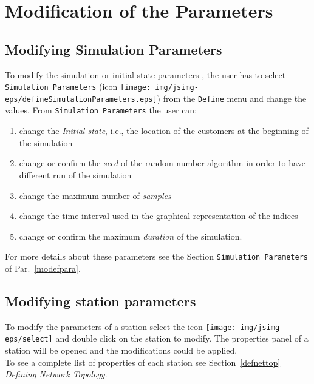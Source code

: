 \section{Modification of the Parameters}
\label{modifpa}

\subsection{Modifying Simulation Parameters}
To modify the simulation or initial state parameters , the user
has to select \texttt{Simulation Parameters} (icon
\texttt{[image: img/jsimg-eps/defineSimulationParameters.eps]})
from the \texttt{Define} menu and change the values. From
\texttt{Simulation Parameters} the user can:
\begin{enumerate} \item change the \emph{Initial state}, i.e., the location
of the customers at the beginning of the simulation \item change
or confirm the \emph{seed} of the random number algorithm in order
to have different run of the simulation \item change the maximum
number of \emph{samples} \item change the time interval used in
the graphical representation of the indices \item change or
confirm the maximum \emph{duration} of the simulation.
\end{enumerate}

\noindent For more details about these parameters see the Section
\texttt{Simulation Parameters} of Par.~\ref{modefpara}.

\subsection{Modifying station parameters}
 To modify the
parameters of a station select the icon
\texttt{[image: img/jsimg-eps/select]} and double
click on the station to modify. The properties panel of a station
will be opened and the modifications could be applied.\\
To see a complete list of properties of each station see
Section~\ref{defnettop} \emph{Defining Network Topology}.

